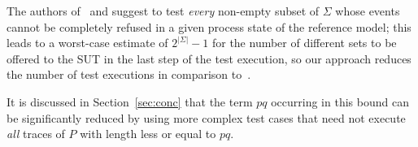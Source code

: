 The authors of~\cite{Hennessy:1988:ATP:50497} and \cite{DBLP:conf/icfem/CavalcantiG07} 
suggest to test {\it every}
non-empty 
subset of $\Sigma$ whose events cannot be completely refused in a given process state
of the reference model; this leads to a worst-case estimate of $2^{|\Sigma|}-1$
for the number of different sets to be offered to the SUT in the last step of 
the test execution, so our approach reduces the number of test executions in comparison
 to~\cite{Hennessy:1988:ATP:50497,DBLP:conf/icfem/CavalcantiG07}. 




 
It is discussed in Section~\ref{sec:conc} that the term $pq$ occurring in this bound can be significantly reduced by using more complex test cases that need not execute {\it all} 
traces of $P$ with length less or equal to $pq$.












